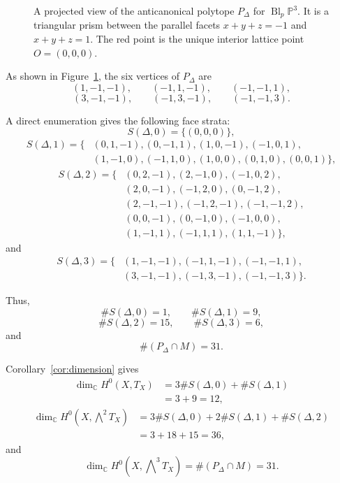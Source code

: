 \documentclass[colorlinks,11pt,reqno]{amsart}
\theoremstyle{definition}
\theoremstyle{remark}
\numberwithin{equation}{section}
\numberwithin{equation}{section}
\newcommand{\CC}{\mathbb{C}}
\begin{document}
\begin{figure}[htbp]

\caption{
A projected view of the anticanonical polytope
\(P_\Delta\) for \(\operatorname{Bl}_{p}\mathbb P^3\).
It is a triangular prism between the parallel facets
\(x+y+z=-1\) and \(x+y+z=1\).
The red point is the unique interior lattice point
\(O=(0,0,0)\).
}
\label{fig:blowup-polytope}
\end{figure}


As shown in Figure~\ref{fig:blowup-polytope}, the six vertices of \(P_\Delta\) are
\[
(1,-1,-1),\qquad (-1,1,-1),\qquad (-1,-1,1),
\]
\[
(3,-1,-1),\qquad (-1,3,-1),\qquad (-1,-1,3).
\]


A direct enumeration gives the following face strata:
\[
S(\Delta,0)=\{(0,0,0)\},
\]
\[
\begin{split}
S(\Delta,1)=\{&
(0,1,-1),(0,-1,1),(1,0,-1),(-1,0,1),\\
&(1,-1,0),(-1,1,0),(1,0,0),(0,1,0),(0,0,1)
\},
\end{split}
\]
\[
\begin{split}
S(\Delta,2)=\{&
(0,2,-1),(2,-1,0),(-1,0,2),\\
&(2,0,-1),(-1,2,0),(0,-1,2),\\
&(2,-1,-1),(-1,2,-1),(-1,-1,2),\\
&(0,0,-1),(0,-1,0),(-1,0,0),\\
&(1,-1,1),(-1,1,1),(1,1,-1)
\},
\end{split}
\]
and
\[
\begin{split}
S(\Delta,3)=\{&
(1,-1,-1),(-1,1,-1),(-1,-1,1),\\
&(3,-1,-1),(-1,3,-1),(-1,-1,3)
\}.
\end{split}
\]

Thus,
\[
\#S(\Delta,0)=1,\qquad \#S(\Delta,1)=9,
\]
\[
\#S(\Delta,2)=15,\qquad \#S(\Delta,3)=6,
\]
and
\[
\#(P_\Delta\cap M)=31.
\]

Corollary~\ref{cor:dimension} gives
\[
\begin{split}
\dim_{\CC}H^0(X,T_X) &= 3\#S(\Delta,0)+\#S(\Delta,1)\\
&=3+9=12,
\end{split}
\]
\[
\begin{split}
\dim_{\CC}
H^0\!\left(X,\bigwedge\nolimits^2T_X\right) &= 3\#S(\Delta,0) +2\#S(\Delta,1) +\#S(\Delta,2)\\
&=3+18+15=36,
\end{split}
\]
and
\[
\dim_{\CC} H^0\!\left(X,\bigwedge\nolimits^3T_X\right) = \#(P_\Delta\cap M) =31.
\]
\end{document}
